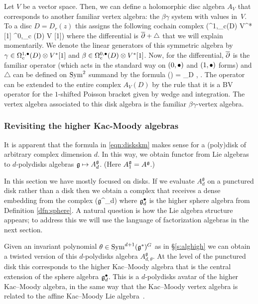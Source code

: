 \documentclass[11pt]{amsart}
\def\lie#1{\ensuremath{\mathfrak{#1}}}
\begin{document}
Let $V$ be a vector space.
Then, we can define a holomorphic disc algebra $A_V$ that corresponds to another familiar vertex algebra: the $\beta\gamma$ system with values in~$V$.
To a disc $D = D_r(z)$ this assigns the following cochain complex
\beqn
\Sym \left(\Omega^{1,\bu}_c(D) \otimes V^* [1] \oplus \Omega^{0,\bu}_c (D) \otimes V [1]\right) 
\eeqn
where the differential is ${\overline{\partial}} + \triangle$ that we will explain momentarily. 
We denote the linear generators of this symmetric algebra by $\gamma \in \Omega^{1,\bullet}_c(D) \otimes V^* [1]$ and $\beta \in \Omega^{0,\bullet}_c(D) \otimes V^* [1]$.
Now, for the differential, ${\overline{\partial}}$ is the familiar operator (which acts in the standard way on $(0,\bullet)$ and $(1,\bullet)$ forms) and $\triangle$ can be defined on $\operatorname{Sym}^2$ summand by the formula
\beqn
\triangle (\gamma \cdot \beta) = \int_D \<\gamma, \beta\> . 
\eeqn
The operator can be extended to the entire complex $A_V(D)$ by the rule that it is a BV operator for the $1$-shifted Poisson bracket given by wedge and integration.
The vertex algebra associated to this disk algebra is the familiar $\beta\gamma$-vertex algebra.

\subsubsection{Revisiting the higher Kac-Moody algebras}

It is apparent that the formula in \eqref{eqn:diskskm} makes sense for a (poly)disk of arbitrary complex dimension $d$.
In this way, we obtain functor from Lie algebras to $d$-polydisks algebras $\mathfrak g \mapsto A^{\mathfrak g}_d$.
(Here $A^{\mathfrak g}_1 = A^{\mathfrak g}$.)

In this section we have mostly focused on disks.
If we evaluate $A^{\lie{g}}_{d}$ on a punctured disk rather than a disk then we obtain a complex that receives a dense embedding from the complex
\beqn
\Sym \left(\lie{g}^\bu_{d}\right) 
\eeqn
where $\lie{g}^\bu_d$ is the higher sphere algebra from Definition \ref{dfn:sphere}.
A natural question is how the Lie algebra structure appears; to address this we will use the language of factorization algebras in the next section.

Given an invariant polynomial $\theta \in \Sym^{d+1}(\lie{g}^*)^G$ as in \S \ref{s:alghigh} we can obtain a twisted version of this $d$-polydisks algebra $A^{\lie{g}}_{d,\theta}$.
At the level of the punctured disk this corresponds to the higher Kac--Moody algebra that is the central extension of the sphere algebra $\lie{\fg}^\bu_{d}$.
This is a $d$-polydisks avatar of the higher Kac--Moody algebra, in the same way that the Kac--Moody vertex algebra is related to the affine Kac--Moody Lie algebra~\cite{GWonKM}.
\end{document}
